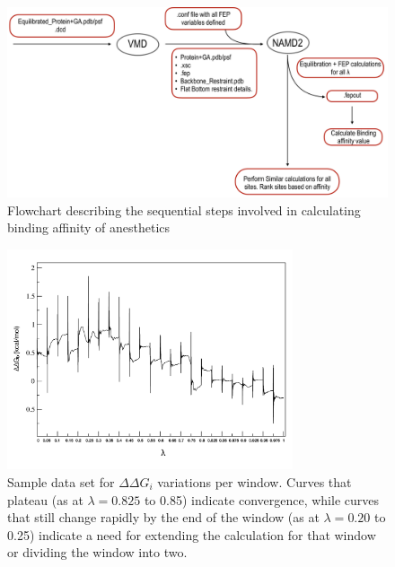 \documentclass[12pt]{article}
\begin{document}
\begin{figure}
\begin{center}
\centering
\includegraphics[width =  1\textwidth]{finlpics/Figure_10}
\caption{Flowchart describing  the sequential steps involved in calculating binding affinity of anesthetics}
\label{fig:flowchart_FEP}
\end{center}
\end{figure}

\begin{figure}
\begin{center}
\centering
\includegraphics[width =  0.75\textwidth]{finlpics/Figure_11}
\caption{Sample data set for $\Delta\Delta G_{i}$ variations per window.%
Curves that plateau (as at $\lambda = 0.825$ to 0.85) indicate convergence, while curves that still change rapidly by the end of the window (as at $\lambda = 0.20$ to 0.25) indicate a need for extending the calculation for that window or dividing the window into two.  }
\label{fig:lambda}
\end{center}
\end{figure}
\end{document}
